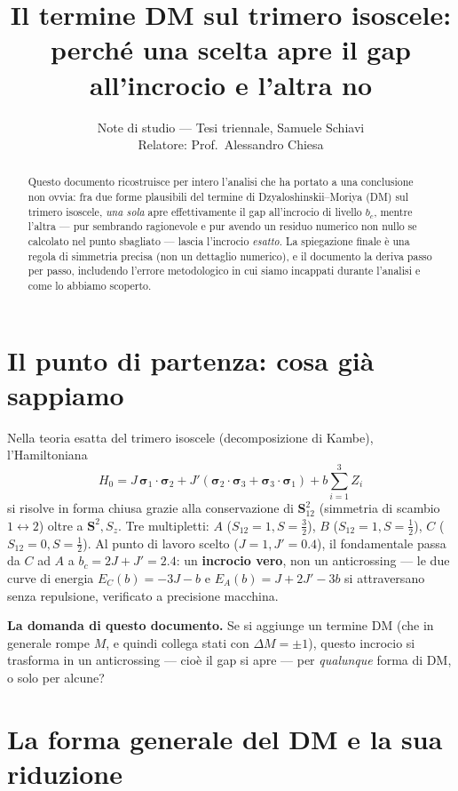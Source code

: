 \documentclass[11pt,a4paper]{article}
\title{\bfseries Il termine DM sul trimero isoscele:\\
perché una scelta apre il gap all'incrocio e l'altra no}
\author{Note di studio — Tesi triennale, Samuele Schiavi\\ \small Relatore: Prof.\ Alessandro Chiesa}
\date{}
\theoremstyle{remark}
\begin{document}
\maketitle
\thispagestyle{fancy}

\begin{abstract}
\noindent
Questo documento ricostruisce per intero l'analisi che ha portato a una conclusione
non ovvia: fra due forme plausibili del termine di Dzyaloshinskii--Moriya (DM) sul
trimero isoscele, \emph{una sola} apre effettivamente il gap all'incrocio di livello
$b_c$, mentre l'altra — pur sembrando ragionevole e pur avendo un residuo numerico
non nullo se calcolato nel punto sbagliato — lascia l'incrocio \emph{esatto}. La
spiegazione finale è una regola di simmetria precisa (non un dettaglio numerico), e il
documento la deriva passo per passo, includendo l'errore metodologico in cui siamo
incappati durante l'analisi e come lo abbiamo scoperto.
\end{abstract}

\section{Il punto di partenza: cosa già sappiamo}

Nella teoria esatta del trimero isoscele (decomposizione di Kambe), l'Hamiltoniana
\[
H_0 = J\,\boldsymbol\sigma_1\cdot\boldsymbol\sigma_2
+ J'(\boldsymbol\sigma_2\cdot\boldsymbol\sigma_3+\boldsymbol\sigma_3\cdot\boldsymbol\sigma_1)
+ b\sum_{i=1}^3 Z_i
\]
si risolve in forma chiusa grazie alla conservazione di $\mathbf S_{12}^2$ (simmetria
di scambio $1\leftrightarrow2$) oltre a $\mathbf S^2,S_z$. Tre multipletti: $A$
($S_{12}{=}1,S{=}\tfrac32$), $B$ ($S_{12}{=}1,S{=}\tfrac12$), $C$
($S_{12}{=}0,S{=}\tfrac12$). Al punto di lavoro scelto ($J{=}1,J'{=}0.4$), il
fondamentale passa da $C$ ad $A$ a $b_c=2J+J'=2.4$: un \textbf{incrocio vero}, non un
anticrossing — le due curve di energia $E_C(b)=-3J-b$ e $E_A(b)=J+2J'-3b$ si
attraversano senza repulsione, verificato a precisione macchina.

\textbf{La domanda di questo documento.} Se si aggiunge un termine DM (che in generale
rompe $M$, e quindi collega stati con $\Delta M=\pm1$), questo incrocio si trasforma
in un anticrossing — cioè il gap si apre — per \emph{qualunque} forma di DM, o solo
per alcune?

\section{La forma generale del DM e la sua riduzione}
\end{document}
